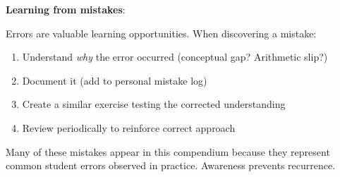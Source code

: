 \begin{note}
\textbf{Learning from mistakes}:

Errors are valuable learning opportunities. When discovering a mistake:
\begin{enumerate}
\item Understand \textit{why} the error occurred (conceptual gap? Arithmetic slip?)
\item Document it (add to personal mistake log)
\item Create a similar exercise testing the corrected understanding
\item Review periodically to reinforce correct approach
\end{enumerate}

Many of these mistakes appear in this compendium because they represent common student errors observed in practice. Awareness prevents recurrence.
\end{note}

